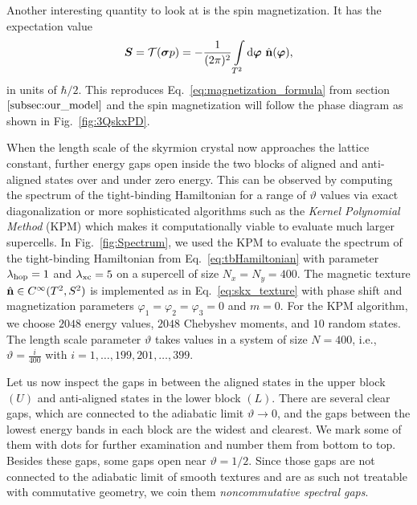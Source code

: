\documentclass[submission, Phys]{SciPost}
\begin{document}
Another interesting quantity to look at is the spin magnetization. It has the expectation value
\begin{align}
    \boldsymbol{S} = \mathcal{T}(\boldsymbol{\sigma} p ) = -\frac{1}{(2\pi)^2}
    \int\limits_{T^2} \mathrm{d} \boldsymbol{\varphi}~ \hat{\mathbf{n}}(\boldsymbol{\varphi}),
\end{align}
in units of $\hbar/2$. 
This reproduces Eq.~\eqref{eq:magnetization_formula} from section $\ref{subsec:our_model}$ and the spin magnetization will follow the phase diagram as shown in Fig.~\ref{fig:3QskxPD}.

When the length scale of the skyrmion crystal now approaches the lattice constant, further energy gaps open inside the two blocks of aligned and anti-aligned states over and under zero energy.
This can be observed by computing the spectrum of the tight-binding Hamiltonian for a range of $\vartheta$ values via exact diagonalization or more sophisticated algorithms such as the \emph{Kernel Polynomial Method} (KPM) \cite{Weiße2006} which makes it computationally viable to evaluate much larger supercells.
In Fig.~\ref{fig:Spectrum}, we used the KPM to evaluate the spectrum of the tight-binding Hamiltonian from Eq.~\eqref{eq:tbHamiltonian} with parameter $\lambda_\mathrm{hop}=1$ and $\lambda_\mathrm{xc}=5$ on a supercell of size $N_x=N_y=400$. The magnetic texture $\hat{\mathbf{n}} \in C^\infty(T^2, S^2)$ is implemented as in Eq.~\eqref{eq:skx_texture} with phase shift and magnetization parameters $\varphi_1=\varphi_2=\varphi_3=0$ and $m=0$. 
For the KPM algorithm, we choose $2048$ energy values, $2048$ Chebyshev moments, and $10$ random states.
The length scale parameter $\vartheta$ takes values in a system of size $N=400$, i.e., $\vartheta=\frac{i}{400}$ with $i=1,\dots,199,201,\dots,399$.
\figureIIIa

Let us now inspect the gaps in between the aligned states in the upper block $(U)$ and anti-aligned states in the lower block $(L)$. 
There are several clear gaps, which are connected to the adiabatic limit $\vartheta\to0$, and the gaps between the lowest energy bands in each block are the widest and clearest. We mark some of them with dots for further examination and number them from bottom to top.
Besides these gaps, some gaps open near $\vartheta=1/2$. 
Since those gaps are not connected to the adiabatic limit of smooth textures and are as such not treatable with commutative geometry, we coin them {\it noncommutative spectral gaps}.
\end{document}
